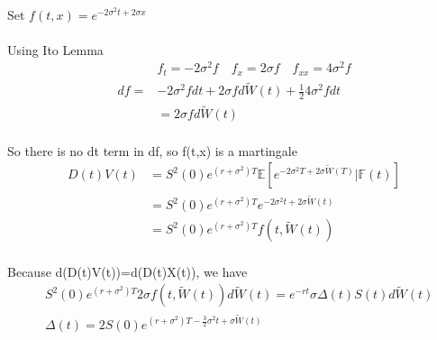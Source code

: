 \documentclass{article}
\begin{document}
\paragraph{}{Set $f(t,x)=e^{-2\sigma ^2t+2\sigma x}$}
\paragraph{}{Using Ito Lemma}
\begin{align*}
  &f_t=-2\sigma^2 f \quad f_x=2\sigma f  \quad f_{xx}=4\sigma^2 f\\
  df=& -2\sigma^2 fdt+2\sigma fd\tilde{W}(t)+\frac{1}{2}4\sigma^2 fdt \\
   & =2\sigma fd\tilde{W}(t)
\end{align*}
\paragraph{}{So there is no dt term in df, so f(t,x) is a martingale}
\begin{align*}
   D(t)V(t)  &  =S^2(0)e^{(r+\sigma^2)T}\mathbb{E}[e^{-2\sigma^2T+2\sigma \tilde{W}(T)}|\mathbb{F}(t)]\\ 
   & =S^2(0)e^{(r+\sigma^2)T}e^{-2\sigma^2t+2\sigma \tilde{W}(t)}\\
   &=S^2(0)e^{(r+\sigma^2)T}f(t,\tilde{W}(t))
\end{align*}
\paragraph{}{Because d(D(t)V(t))=d(D(t)X(t)), we have}
\begin{align*}
  &S^2(0)e^{(r+\sigma^2)T}2\sigma f(t,\tilde{W}(t))d\tilde{W}(t)=e^{-rt}\sigma \Delta(t)S(t)d\tilde{W}(t) \\
 & \Delta(t)=2S(0)e^{(r+\sigma^2)T-\frac{3}{2}\sigma^2 t+\sigma\tilde{W}(t)}\\
\end{align*}
\end{document}
